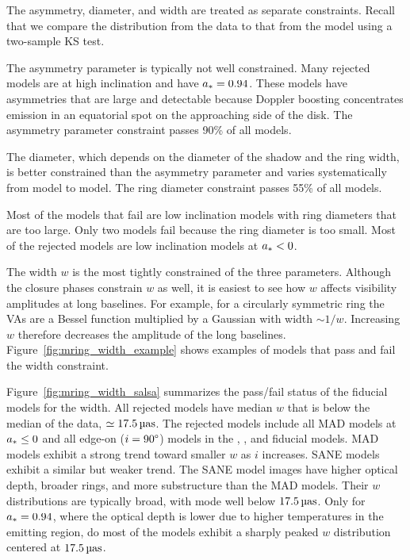 The \mring asymmetry, diameter, and width are treated as separate constraints.
Recall that we compare the distribution from the data to that from the model using a two-sample KS test.

The asymmetry parameter is typically not well constrained.
Many rejected models are at high inclination and have $a_* =0.94$.
These models have asymmetries that are large and detectable because Doppler boosting concentrates emission in an equatorial spot on the approaching side of the disk.
The asymmetry parameter constraint passes 90\% of all models.

The \mring diameter, which depends on the diameter of the shadow and the ring width, is better constrained than the asymmetry parameter and varies systematically from model to model.
The ring diameter constraint passes 55\% of all models.

Most of the models that fail are low inclination models with ring diameters that are too large. Only two \bhac models fail because the ring diameter is too small.  Most of the rejected models are low inclination models at $a_* < 0$.

The \mring width $w$ is the most tightly constrained of the three \mring parameters.
Although the closure phases constrain $w$ as well, it is easiest to see how $w$ affects visibility amplitudes at long baselines.
For example, for a circularly symmetric ring the VAs are a Bessel function multiplied by a Gaussian with width $\sim 1/w$.  Increasing $w$ therefore decreases the amplitude of the long baselines.
Figure~\ref{fig:mring_width_example} shows examples of models that pass and fail the \mring width constraint.

Figure~\ref{fig:mring_width_salsa} summarizes the pass/fail status of the fiducial models for the \mring width.
All rejected models have median $w$ that is below the median of the data, $ \simeq 17.5\uas$.
The rejected models include all MAD models at $a_* \le 0$ and all edge-on ($i = 90\degree$) models in the \kharma, \bhac, and \hamr fiducial models.
MAD models exhibit a strong trend toward smaller $w$ as $i$ increases.
SANE models exhibit a similar but weaker trend.
The SANE model images have  higher optical depth, broader rings, and more substructure than the MAD models.
Their $w$ distributions are typically broad, with mode well below $17.5\uas$.
Only for $a_* = 0.94$, where the optical depth is lower due to higher temperatures in the emitting region, do most of the models exhibit a sharply peaked $w$ distribution centered at $17.5\uas$.

